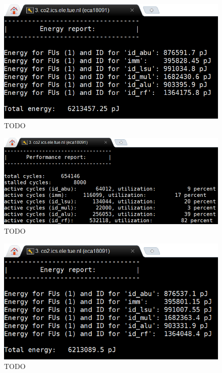 \documentclass[letterpaper, 10 pt, conference]{ieeeconf}  %
\begin{document}
\begin{figure}[h]
\begin{center}
\includegraphics[scale=0.35]{images/O101.png}
\caption{TODO}
\label{fig:TODO}
\end{center}
\end{figure}

\begin{figure}[h]
\begin{center}
\includegraphics[scale=0.35]{images/O102.png}
\caption{TODO}
\label{fig:TODO}
\end{center}
\end{figure}

\begin{figure}[h]
\begin{center}
\includegraphics[scale=0.35]{images/O201.png}
\caption{TODO}
\label{fig:TODO}
\end{center}
\end{figure}
\end{document}
